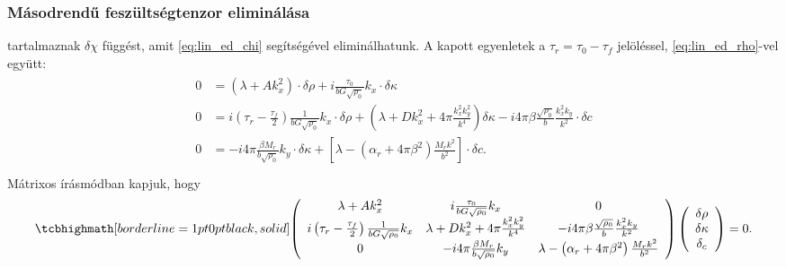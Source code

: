 \documentclass[10pt,a4paper]{scrartcl}
\begin{document}
\subsubsection{Másodrendű feszültségtenzor eliminálása}
 tartalmaznak $\delta\chi$ függést, amit \cref{eq:lin_ed_chi} segítségével eliminálhatunk. A kapott egyenletek a ${\tau _r} = {\tau _0} - {\tau _f}$ jelöléssel, \cref{eq:lin_ed_rho}-vel együtt:
\begin{gather}\begin{aligned}
  0 &  = \left( {\lambda  + Ak_x^2} \right) \cdot \delta \rho  + i\frac{{{\tau _0}}}{{bG\sqrt {{\rho _0}} }}{k_x} \cdot \delta \kappa  \\ 
  0 &  = i\left( {{\tau _r} - \frac{{{\tau _f}}}{2}} \right)\frac{1}{{bG\sqrt {{\rho _0}} }}{k_x} \cdot \delta \rho  + \left( {\lambda  + Dk_x^2 + 4\pi \frac{{k_x^2 k_y^2}}{{{k^4}}}} \right)\delta \kappa  - i4\pi \beta \frac{{\sqrt {{\rho _0}} }}{b}\frac{{k_x^2{k_y}}}{{{k^2}}} \cdot \delta c \\ 
  0 &  =  - i4\pi \frac{{\beta {M_r}}}{{b\sqrt {{\rho _0}} }}{k_y} \cdot \delta \kappa  + \left[ {\lambda  - \left( {{\alpha _r} + 4\pi {\beta ^2}} \right)\frac{{{M_r}{k^2}}}{{{b^2}}}} \right] \cdot \delta c. \\ 
\end{aligned}
\end{gather}
Mátrixos írásmódban kapjuk, hogy 
\begin{equation}
\tcbhighmath[borderline={1pt}{0pt}{black,solid}]{
\left({\begin{array}{*{20}{c}}
  {\lambda  + Ak_x^2}&{i\frac{{{\tau _0}}}{{bG\sqrt {{\rho _0}} }}{k_x}}&0 \\ 
  {i\left( {{\tau _r} - \frac{{{\tau _f}}}{2}} \right)\frac{1}{{bG\sqrt {{\rho _0}} }}{k_x}}&{\lambda  + Dk_x^2 + 4\pi \frac{{k_x^2 k_y^2}}{{{k^4}}}}&{ - i4\pi \beta \frac{{\sqrt {{\rho _0}} }}{b}\frac{{k_x^2{k_y}}}{{{k^2}}}} \\ 
  0&{ - i4\pi \frac{{\beta {M_r}}}{{b\sqrt {{\rho _0}} }}{k_y} }&{\lambda  - \left( {{\alpha _r} + 4\pi {\beta ^2}} \right)\frac{{{M_r}{k^2}}}{{{b^2}}}} 
\end{array}} \right)\left( {\begin{array}{*{20}{c}}
  {\delta \rho } \\ 
  {\delta \kappa } \\ 
  {{\delta _c}} 
\end{array}} \right) = 0.}
\end{equation}
\end{document}
